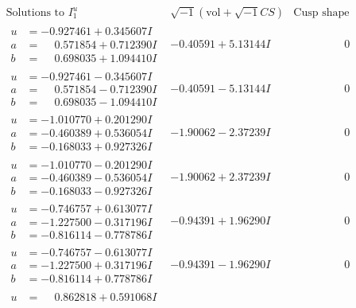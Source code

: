\documentclass[1p]{elsarticle_modified}
\theoremstyle{definition}
\newcommand{\I}{\sqrt{-1}}
\begin{document}
$$\begin{array}{c|c|c}  
\text{Solutions to }I^u_{1}& \I (\text{vol} + \sqrt{-1}CS) & \text{Cusp shape}\\
 \hline 
\begin{aligned}
u &= -0.927461 + 0.345607 I \\
a &= \phantom{-}0.571854 + 0.712390 I \\
b &= \phantom{-}0.698035 + 1.094410 I\end{aligned}
 & -0.40591 + 5.13144 I & \phantom{-0.000000 } 0 \\ \hline\begin{aligned}
u &= -0.927461 - 0.345607 I \\
a &= \phantom{-}0.571854 - 0.712390 I \\
b &= \phantom{-}0.698035 - 1.094410 I\end{aligned}
 & -0.40591 - 5.13144 I & \phantom{-0.000000 } 0 \\ \hline\begin{aligned}
u &= -1.010770 + 0.201290 I \\
a &= -0.460389 + 0.536054 I \\
b &= -0.168033 + 0.927326 I\end{aligned}
 & -1.90062 - 2.37239 I & \phantom{-0.000000 } 0 \\ \hline\begin{aligned}
u &= -1.010770 - 0.201290 I \\
a &= -0.460389 - 0.536054 I \\
b &= -0.168033 - 0.927326 I\end{aligned}
 & -1.90062 + 2.37239 I & \phantom{-0.000000 } 0 \\ \hline\begin{aligned}
u &= -0.746757 + 0.613077 I \\
a &= -1.227500 - 0.317196 I \\
b &= -0.816114 - 0.778786 I\end{aligned}
 & -0.94391 + 1.96290 I & \phantom{-0.000000 } 0 \\ \hline\begin{aligned}
u &= -0.746757 - 0.613077 I \\
a &= -1.227500 + 0.317196 I \\
b &= -0.816114 + 0.778786 I\end{aligned}
 & -0.94391 - 1.96290 I & \phantom{-0.000000 } 0 \\ \hline\begin{aligned}
u &= \phantom{-}0.862818 + 0.591068 I \\

\end{aligned}
\end{array}$$
\end{document}
